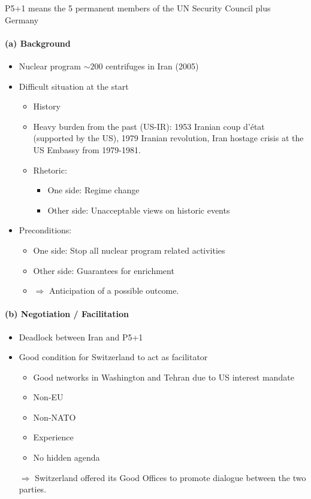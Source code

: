 P5+1 means the 5 permanent members of the UN Security Council plus Germany

\paragraph{(a) Background}

\begin{itemize}
    \item Nuclear program $\sim 200$ centrifuges in Iran (2005)
    \item Difficult situation at the start
        \begin{itemize}
            \item History
            \item Heavy burden from the past (US-IR): 1953 Iranian coup d'état
                (supported by the US), 1979 Iranian revolution, Iran hostage
                crisis at the US Embassy from 1979-1981.
            \item Rhetoric:
                \begin{itemize}
                    \item One side: Regime change
                    \item Other side: Unacceptable views on historic events
                \end{itemize}
        \end{itemize}
    \item Preconditions:
        \begin{itemize}
            \item One side: Stop all nuclear program related activities
            \item Other side: Guarantees for enrichment
            \item $\Rightarrow$ Anticipation of a possible outcome.
        \end{itemize}
\end{itemize}

\paragraph{(b) Negotiation / Facilitation}

\begin{itemize}
    \item Deadlock between Iran and P5+1
    \item Good condition for Switzerland to act as facilitator
        \begin{itemize}
            \item Good networks in Washington and Tehran due to US interest mandate
            \item Non-EU
            \item Non-NATO
            \item Experience
            \item No hidden agenda
        \end{itemize}
        $\Rightarrow$ Switzerland offered its Good Offices to promote dialogue
        between the two parties.
\end{itemize}


